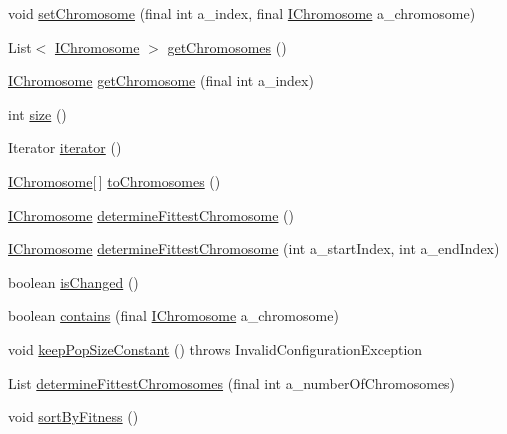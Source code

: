 \begin{DoxyCompactItemize}
void \hyperlink{classorg_1_1jgap_1_1_population_aaa80c42ce70b695356b338b11d7b0364}{set\-Chromosome} (final int a\-\_\-index, final \hyperlink{interfaceorg_1_1jgap_1_1_i_chromosome}{I\-Chromosome} a\-\_\-chromosome)
\item 
List$<$ \hyperlink{interfaceorg_1_1jgap_1_1_i_chromosome}{I\-Chromosome} $>$ \hyperlink{classorg_1_1jgap_1_1_population_aa9deff3f371931e7151070af03465e83}{get\-Chromosomes} ()
\item 
\hyperlink{interfaceorg_1_1jgap_1_1_i_chromosome}{I\-Chromosome} \hyperlink{classorg_1_1jgap_1_1_population_a8e095445f8d0395d3676974349ad0c13}{get\-Chromosome} (final int a\-\_\-index)
\item 
int \hyperlink{classorg_1_1jgap_1_1_population_a2d09529f8e93d57a0546625362ca5bee}{size} ()
\item 
Iterator \hyperlink{classorg_1_1jgap_1_1_population_a644b52f341ebe005d1dc1c2e84f2591e}{iterator} ()
\item 
\hyperlink{interfaceorg_1_1jgap_1_1_i_chromosome}{I\-Chromosome}\mbox{[}$\,$\mbox{]} \hyperlink{classorg_1_1jgap_1_1_population_aecabe6047fb1b1a7ec80d9b13fb4e7a0}{to\-Chromosomes} ()
\item 
\hyperlink{interfaceorg_1_1jgap_1_1_i_chromosome}{I\-Chromosome} \hyperlink{classorg_1_1jgap_1_1_population_ab152be01c73200bf39e61518d0146379}{determine\-Fittest\-Chromosome} ()
\item 
\hyperlink{interfaceorg_1_1jgap_1_1_i_chromosome}{I\-Chromosome} \hyperlink{classorg_1_1jgap_1_1_population_a010cf1cbf6a1f771d34e5c3ce9420f25}{determine\-Fittest\-Chromosome} (int a\-\_\-start\-Index, int a\-\_\-end\-Index)
\item 
boolean \hyperlink{classorg_1_1jgap_1_1_population_ab35d09d90bc1262d12bc22df23689df4}{is\-Changed} ()
\item 
boolean \hyperlink{classorg_1_1jgap_1_1_population_a1c07a36de9973bee29421a44f99b8319}{contains} (final \hyperlink{interfaceorg_1_1jgap_1_1_i_chromosome}{I\-Chromosome} a\-\_\-chromosome)
\item 
void \hyperlink{classorg_1_1jgap_1_1_population_a7dd9dbd2fecb4e2c4841787fd78ea64c}{keep\-Pop\-Size\-Constant} ()  throws Invalid\-Configuration\-Exception 
\item 
List \hyperlink{classorg_1_1jgap_1_1_population_a9ec112af7542cb12b4a891d259a31038}{determine\-Fittest\-Chromosomes} (final int a\-\_\-number\-Of\-Chromosomes)
\item 
void \hyperlink{classorg_1_1jgap_1_1_population_ac66aac96dfb67e94a3de2284cd9c9066}{sort\-By\-Fitness} ()

\end{DoxyCompactItemize}
